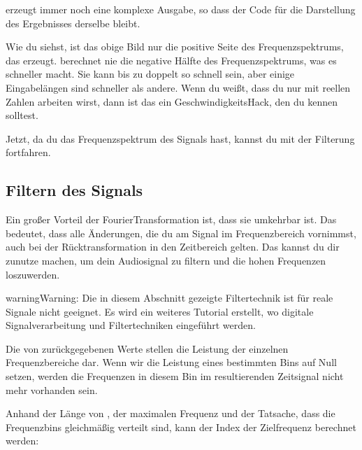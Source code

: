 \documentclass[letterpaper,10pt,english]{jupyterBook}
\begin{document}
\sphinxAtStartPar
{} erzeugt immer noch eine komplexe Ausgabe, so dass der Code für die Darstellung des Ergebnisses derselbe bleibt.

\sphinxAtStartPar
Wie du siehst, ist das obige Bild nur die positive Seite des Frequenzspektrums, das  erzeugt.  berechnet nie die negative Hälfte des Frequenzspektrums, was es schneller macht.
Sie kann bis zu doppelt so schnell sein, aber einige Eingabelängen sind schneller als andere. Wenn du weißt, dass du nur mit reellen Zahlen arbeiten wirst, dann ist das ein Geschwindigkeits\sphinxhyphen{}Hack, den du kennen solltest.

\sphinxAtStartPar
Jetzt, da du das Frequenzspektrum des Signals hast, kannst du mit der Filterung fortfahren.


\subsection{Filtern des Signals}
\label{\detokenize{content/T_Spektralanalyse_Audio:filtern-des-signals}}
\sphinxAtStartPar
Ein großer Vorteil der Fourier\sphinxhyphen{}Transformation ist, dass sie umkehrbar ist. Das bedeutet, dass alle Änderungen, die du am Signal im Frequenzbereich vornimmst, auch bei der Rücktransformation in den Zeitbereich gelten. Das kannst du dir zunutze machen, um dein Audiosignal zu filtern und die hohen Frequenzen loszuwerden.

\begin{sphinxadmonition}{warning}{Warning:}
\sphinxAtStartPar
Die in diesem Abschnitt gezeigte Filtertechnik ist für reale Signale nicht geeignet. Es wird ein weiteres Tutorial erstellt, wo digitale Signalverarbeitung und Filtertechniken eingeführt werden.
\end{sphinxadmonition}

\sphinxAtStartPar
Die von  zurückgegebenen Werte stellen die Leistung der einzelnen Frequenzbereiche dar. Wenn wir die Leistung eines bestimmten Bins auf Null setzen, werden die Frequenzen in diesem Bin im resultierenden Zeitsignal nicht mehr vorhanden sein.

\sphinxAtStartPar
Anhand der Länge von , der maximalen Frequenz und der Tatsache, dass die Frequenzbins gleichmäßig verteilt sind, kann der Index der Zielfrequenz berechnet werden:
\end{document}
